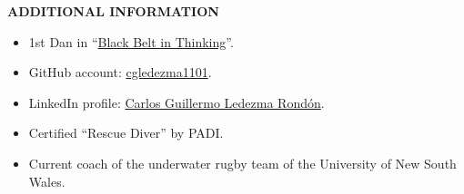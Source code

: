 \documentclass[10pt]{article}
\begin{document}
\vspace{6mm}

\textbf{\uppercase{Additional information}}

\begin{itemize}
	\item 1st Dan in ``\href{http://www.blackbeltinthinking.com/}{Black Belt in Thinking}''.
	\item GitHub account: \href{https://github.com/cgledezma1101}{cgledezma1101}.
	\item LinkedIn profile: \href{https://au.linkedin.com/in/cgledezma}{Carlos Guillermo Ledezma Rondón}.
	\item Certified ``Rescue Diver'' by PADI.
	\item Current coach of the underwater rugby team of the University of New South Wales.
\end{itemize}
\end{document}
